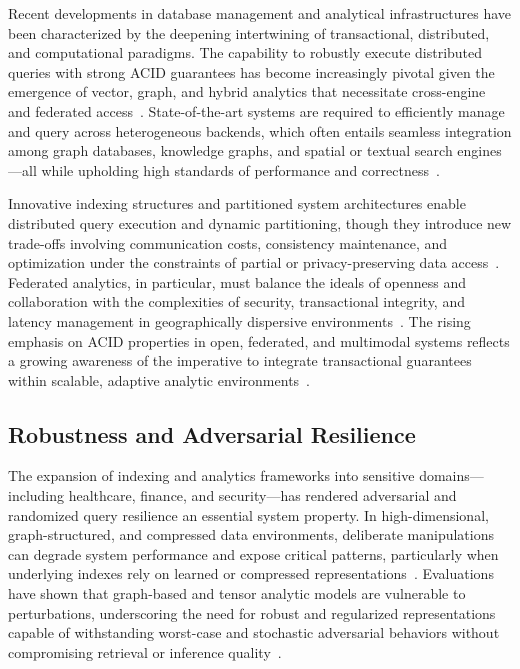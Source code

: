\documentclass[sigconf]{acmart}
\begin{document}
Recent developments in database management and analytical infrastructures have been characterized by the deepening intertwining of transactional, distributed, and computational paradigms. The capability to robustly execute distributed queries with strong ACID guarantees has become increasingly pivotal given the emergence of vector, graph, and hybrid analytics that necessitate cross-engine and federated access~\cite{ref80,ref87,ref110}. State-of-the-art systems are required to efficiently manage and query across heterogeneous backends, which often entails seamless integration among graph databases, knowledge graphs, and spatial or textual search engines---all while upholding high standards of performance and correctness~\cite{ref79,ref110,ref112}.

Innovative indexing structures and partitioned system architectures enable distributed query execution and dynamic partitioning, though they introduce new trade-offs involving communication costs, consistency maintenance, and optimization under the constraints of partial or privacy-preserving data access~\cite{ref80,ref81,ref82,ref88,ref89}. Federated analytics, in particular, must balance the ideals of openness and collaboration with the complexities of security, transactional integrity, and latency management in geographically dispersive environments~\cite{ref91,ref93,ref95}. The rising emphasis on ACID properties in open, federated, and multimodal systems reflects a growing awareness of the imperative to integrate transactional guarantees within scalable, adaptive analytic environments~\cite{ref110,ref111,ref112}.

\subsection{Robustness and Adversarial Resilience}

The expansion of indexing and analytics frameworks into sensitive domains---including healthcare, finance, and security---has rendered adversarial and randomized query resilience an essential system property. In high-dimensional, graph-structured, and compressed data environments, deliberate manipulations can degrade system performance and expose critical patterns, particularly when underlying indexes rely on learned or compressed representations~\cite{ref107,ref110}. Evaluations have shown that graph-based and tensor analytic models are vulnerable to perturbations, underscoring the need for robust and regularized representations capable of withstanding worst-case and stochastic adversarial behaviors without compromising retrieval or inference quality~\cite{ref104,ref107,ref118}.
\end{document}
